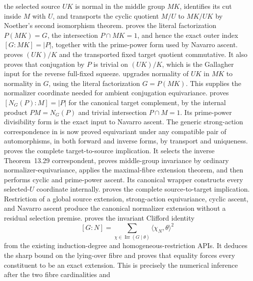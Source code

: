 \documentclass[11pt]{article}
\newcommand{\Irr}{\operatorname{Irr}}
\begin{document}
the selected source \(UK\) is normal in the middle group \(MK\), identifies
its cut inside \(M\) with \(U\), and transports the cyclic quotient
\(M/U\) to \(MK/UK\) by Noether's second isomorphism theorem.
 proves the literal
factorization \(P(MK)=G\), the intersection \(P\cap MK=1\), and hence the
exact outer index \([G:MK]=|P|\), together with the prime-power form used
by Navarro ascent.
 proves
\((UK)/K\) and the transported fixed target quotient commutative.  It also
proves that conjugation by \(P\) is trivial on \((UK)/K\), which is the
Gallagher input for the reverse full-fixed squeeze.
 upgrades
normality of \(UK\) in \(MK\) to normality in \(G\), using the literal
factorization \(G=P(MK)\).  This supplies the normalizer coordinate needed
for ambient conjugation equivariance.
 proves
\([N_G(P):M]=|P|\) for the canonical target complement, by the internal
product \(PM=N_G(P)\) and trivial intersection \(P\cap M=1\).  Its
prime-power divisibility form is the exact input to Navarro ascent.
The generic strong-action correspondence in
 is now proved equivariant
under any compatible pair of automorphisms, in both forward and inverse
forms, by transport and uniqueness.
 proves the
complete target-to-source implication.  It selects the inverse
Theorem~13.29 correspondent, proves middle-group invariance by ordinary
normalizer-equivariance, applies the maximal-fibre extension theorem, and
then performs cyclic and prime-power ascent.  Its canonical wrapper
constructs every selected-\(U\) coordinate internally.
 proves the
complete source-to-target implication.  Restriction of a global source
extension, strong-action equivariance, cyclic ascent, and Navarro ascent
produce the canonical normalizer extension without a residual selection
premise.
 proves the invariant
Clifford identity
\[
 [G:N]=\sum_{\chi\in\Irr(G\mid\theta)}
   \langle\chi_N,\theta\rangle^2
\]
from the existing induction-degree and homogeneous-restriction APIs.  It
deduces the sharp bound on the lying-over fibre and proves that equality
forces every constituent to be an exact extension.  This is precisely the
numerical inference after the two fibre cardinalities and
\end{document}
